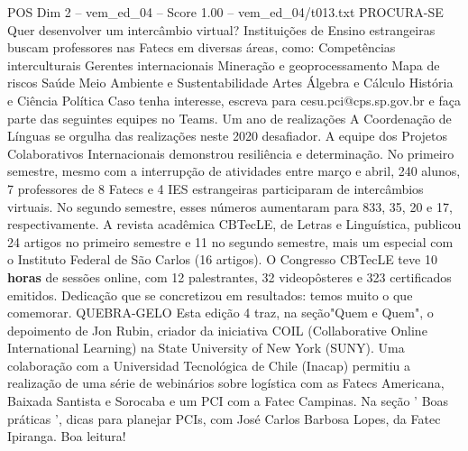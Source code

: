 \begin{textsample}{POS Dim 2 – vem\_ed\_04 – Score 1.00 – vem\_ed\_04/t013.txt}  \label{ex:f2_pos_029}
PROCURA-SE Quer desenvolver um intercâmbio virtual?
Instituições de Ensino estrangeiras buscam professores nas Fatecs em diversas áreas, como: Competências interculturais Gerentes internacionais Mineração e geoprocessamento Mapa de riscos Saúde Meio Ambiente e Sustentabilidade Artes Álgebra e Cálculo História e Ciência Política Caso tenha interesse, escreva para cesu.pci@cps.sp.gov.br e faça parte das seguintes equipes no Teams.
Um ano de realizações A Coordenação de Línguas se orgulha das realizações neste 2020 desafiador.
A equipe dos Projetos Colaborativos Internacionais demonstrou resiliência e determinação.
No primeiro semestre, mesmo com a interrupção de atividades entre março e abril, 240 alunos, 7 professores de 8 Fatecs e 4 IES estrangeiras participaram de intercâmbios virtuais.
No segundo semestre, esses números aumentaram para 833, 35, 20 e 17, respectivamente.
A revista acadêmica CBTecLE, de Letras e Linguística, publicou 24 artigos no primeiro semestre e 11 no segundo semestre, mais um especial com o Instituto Federal de São Carlos (16 artigos).
O Congresso CBTecLE teve 10 \textbf{horas} de sessões online, com 12 palestrantes, 32 videopôsteres e 323 certificados emitidos.
Dedicação que se concretizou em resultados: temos muito o que comemorar.
QUEBRA-GELO Esta edição 4 traz, na seção"Quem e Quem", o depoimento de Jon Rubin, criador da iniciativa COIL (Collaborative Online International Learning) na State University of New York (SUNY).
Uma colaboração com a Universidad Tecnológica de Chile (Inacap) permitiu a realização de uma série de webinários sobre logística com as Fatecs Americana, Baixada Santista e Sorocaba e um PCI com a Fatec Campinas.
Na seção ' Boas práticas ', dicas para planejar PCIs, com José Carlos Barbosa Lopes, da Fatec Ipiranga.
Boa leitura!

\end{textsample}
